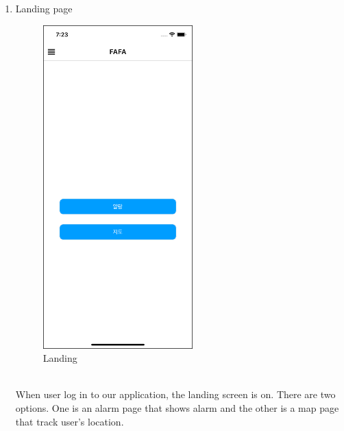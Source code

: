 \documentclass[conference]{IEEEtran}
\begin{document}
\begin{enumerate}
    \item Landing page\\
    \begin{figure}[htbp]
    \centering
    \includegraphics{images/f9.png}
    \caption{Landing}
    \end{figure}\\
    When user log in to our application, the landing screen is on. There are two options. One is an alarm page that shows alarm and the other is a map page that track user’s location.\\
    

\end{enumerate}
\end{document}
